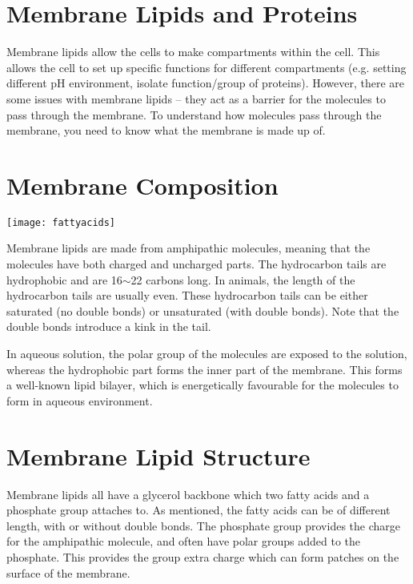 \section{Membrane Lipids and Proteins}

Membrane lipids allow the cells to make compartments within the cell.
This allows the cell to set up specific functions for different compartments (e.g. setting different pH environment, isolate function/group of proteins).
However, there are some issues with membrane lipids -- they act as a barrier for the molecules to pass through the membrane.
To understand how molecules pass through the membrane, you need to  know what the membrane is made up of.

\section{Membrane Composition}

\begin{center}
\texttt{[image: fattyacids]}
\end{center}

Membrane lipids are made from amphipathic molecules, meaning that the molecules have both charged and uncharged parts.
The hydrocarbon tails are hydrophobic and are 16$\sim$22 carbons long.
In animals, the length of the hydrocarbon tails are usually even.
These hydrocarbon tails can be either saturated (no double bonds) or unsaturated (with double bonds).
Note that the double bonds introduce a kink in the tail.

In aqueous solution, the polar group of the molecules are exposed to the solution, whereas the hydrophobic part forms the inner part of the membrane.
This forms a well-known lipid bilayer, which is energetically favourable for the molecules to form in aqueous environment.

\section{Membrane Lipid Structure}

Membrane lipids all have a glycerol backbone which two fatty acids and a phosphate group attaches to.
As mentioned, the fatty acids can be of different length, with or without double bonds.
The phosphate group provides the charge for the amphipathic molecule, and often have polar groups added to the phosphate.
This provides the group extra charge which can form patches on the surface of the membrane.

